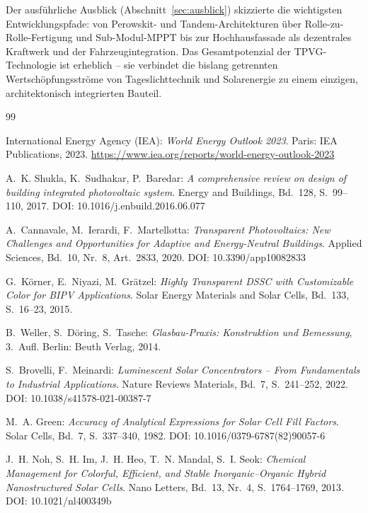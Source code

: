 ﻿\documentclass[a4paper,12pt]{article}
\theoremstyle{definition}
\theoremstyle{remark}
\begin{document}
Der ausführliche Ausblick (Abschnitt~\ref{sec:ausblick}) skizzierte
die wichtigsten Entwicklungspfade: von Perowskit- und Tandem-Architekturen
über Rolle-zu-Rolle-Fertigung und Sub-Modul-MPPT bis zur Hochhausfassade
als dezentrales Kraftwerk und der Fahrzeugintegration. Das Gesamtpotenzial
der TPVG-Technologie ist erheblich -- sie verbindet die bislang getrennten
Wertschöpfungsströme von Tageslichttechnik und Solarenergie zu einem
einzigen, architektonisch integrierten Bauteil.

\begin{thebibliography}{99}

International Energy Agency (IEA):
\textit{World Energy Outlook 2023}.
Paris: IEA Publications, 2023.
\url{https://www.iea.org/reports/world-energy-outlook-2023}

A.~K. Shukla, K.~Sudhakar, P.~Baredar:
\textit{A comprehensive review on design of building integrated photovoltaic system}.
Energy and Buildings, Bd.~128, S.~99--110, 2017.
DOI: 10.1016/j.enbuild.2016.06.077

A.~Cannavale, M.~Ierardi, F.~Martellotta:
\textit{Transparent Photovoltaics: New Challenges and Opportunities for Adaptive
and Energy-Neutral Buildings}.
Applied Sciences, Bd.~10, Nr.~8, Art.~2833, 2020.
DOI: 10.3390/app10082833

G.~Körner, E.~Niyazi, M.~Grätzel:
\textit{Highly Transparent DSSC with Customizable Color for
BIPV Applications}.
Solar Energy Materials and Solar Cells, Bd.~133, S.~16--23, 2015.

B.~Weller, S.~Döring, S.~Tasche:
\textit{Glasbau-Praxis: Konstruktion und Bemessung}, 3.~Aufl.
Berlin: Beuth Verlag, 2014.

S.~Brovelli, F.~Meinardi:
\textit{Luminescent Solar Concentrators -- From Fundamentals to
Industrial Applications}.
Nature Reviews Materials, Bd.~7, S.~241--252, 2022.
DOI: 10.1038/s41578-021-00387-7

M.~A. Green:
\textit{Accuracy of Analytical Expressions for Solar Cell Fill Factors}.
Solar Cells, Bd.~7, S.~337--340, 1982.
DOI: 10.1016/0379-6787(82)90057-6

J.~H. Noh, S.~H. Im, J.~H. Heo, T.~N. Mandal, S.~I. Seok:
\textit{Chemical Management for Colorful, Efficient, and Stable
Inorganic--Organic Hybrid Nanostructured Solar Cells}.
Nano Letters, Bd.~13, Nr.~4, S.~1764--1769, 2013.
DOI: 10.1021/nl400349b


\end{thebibliography}
\end{document}
